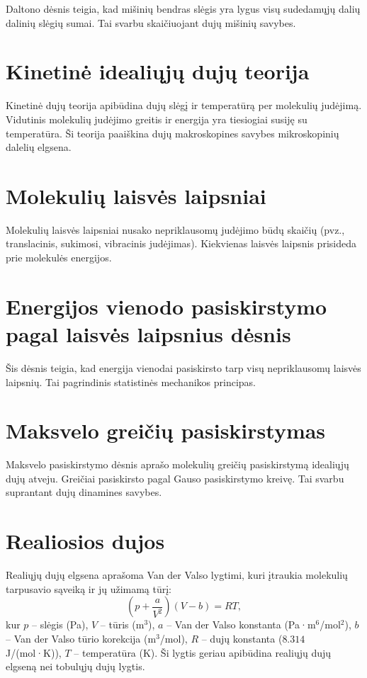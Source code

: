 \documentclass[a4paper,12pt]{article}
\begin{document}
Daltono dėsnis teigia, kad mišinių bendras slėgis yra lygus visų sudedamųjų dalių dalinių slėgių sumai. Tai svarbu skaičiuojant dujų mišinių savybes.

\section{Kinetinė idealiųjų dujų teorija}

Kinetinė dujų teorija apibūdina dujų slėgį ir temperatūrą per molekulių judėjimą. Vidutinis molekulių judėjimo greitis ir energija yra tiesiogiai susiję su temperatūra. Ši teorija paaiškina dujų makroskopines savybes mikroskopinių dalelių elgsena.

\section{Molekulių laisvės laipsniai}

Molekulių laisvės laipsniai nusako nepriklausomų judėjimo būdų skaičių (pvz., translacinis, sukimosi, vibracinis judėjimas). Kiekvienas laisvės laipsnis prisideda prie molekulės energijos.

\section{Energijos vienodo pasiskirstymo pagal laisvės laipsnius dėsnis}

Šis dėsnis teigia, kad energija vienodai pasiskirsto tarp visų nepriklausomų laisvės laipsnių. Tai pagrindinis statistinės mechanikos principas.

\section{Maksvelo greičių pasiskirstymas}

Maksvelo pasiskirstymo dėsnis aprašo molekulių greičių pasiskirstymą idealiųjų dujų atveju. Greičiai pasiskirsto pagal Gauso pasiskirstymo kreivę. Tai svarbu suprantant dujų dinamines savybes.

\section{Realiosios dujos}

Realiųjų dujų elgsena aprašoma Van der Valso lygtimi, kuri įtraukia molekulių tarpusavio sąveiką ir jų užimamą tūrį:
\[
\left( p + \frac{a}{V^2} \right) (V - b) = RT,
\]
kur $p$ – slėgis (Pa), $V$ – tūris (m\(^3\)), $a$ – Van der Valso konstanta (Pa·m\(^6\)/mol\(^2\)), $b$ – Van der Valso tūrio korekcija (m\(^3\)/mol), $R$ – dujų konstanta ($8.314$ J/(mol·K)), $T$ – temperatūra (K). Ši lygtis geriau apibūdina realiųjų dujų elgseną nei tobulųjų dujų lygtis.
\end{document}
